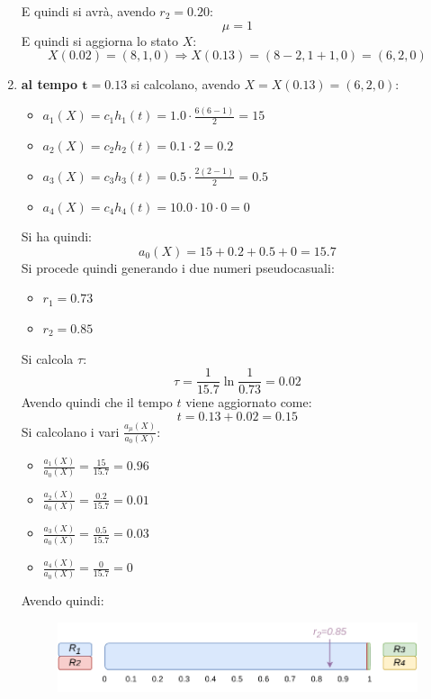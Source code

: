 \documentclass{article}
\begin{document}
\begin{enumerate}[label=\roman*)]
  E quindi si avrà, avendo $r_2=0.20$:
  \[\mu=1\]
  E quindi si aggiorna lo stato $X$:
  \[X(0.02) = (8,1,0) \Rightarrow X(0.13) = (8-2,1+1,0) = (6,2,0)\]
  \newpage
  \item \textbf{al tempo $\mathbf{t=0.13}$} si calcolano, avendo
  $X=X(0.13)=(6,2,0)$: 
  \begin{multicols}{2}
    \begin{itemize}
      \item $a_1(X)=c_1h_1(t)=1.0\cdot\frac{6(6-1)}{2}=15$
      \item $a_2(X)=c_2h_2(t)=0.1\cdot 2=0.2$
      \item $a_3(X)=c_3h_3(t)=0.5\cdot \frac{2(2-1)}{2}=0.5$
      \item $a_4(X)=c_4h_4(t)=10.0\cdot 10 \cdot 0=0$
    \end{itemize}
  \end{multicols}
  Si ha quindi:
  \[a_0(X)=15+0.2+0.5+0=15.7\]
  Si procede quindi generando i due numeri pseudocasuali:
  \begin{multicols}{2}
    \begin{itemize}
      \item $r_1=0.73$
      \item $r_2=0.85$
    \end{itemize}
  \end{multicols}
  Si calcola $\tau$:
  \[\tau=\frac{1}{15.7}\ln\frac{1}{0.73}=0.02\]
  Avendo quindi che il tempo $t$ viene aggiornato come:
  \[t=0.13+0.02=0.15\]
  Si calcolano i vari $\frac{a_\mu(X)}{a_0(X)}$:
  \begin{multicols}{2}
    \begin{itemize}
      \item $\frac{a_1(X)}{a_0(X)}=\frac{15}{15.7}=0.96$
      \item $\frac{a_2(X)}{a_0(X)}=\frac{0.2}{15.7}=0.01$
      \item $\frac{a_3(X)}{a_0(X)}=\frac{0.5}{15.7}=0.03$
      \item $\frac{a_4(X)}{a_0(X)}=\frac{0}{15.7}=0$
    \end{itemize}
  \end{multicols}
  Avendo quindi:
  \begin{figure}[H]
    \centering
    \includegraphics[scale = 0.8]{img/t3.pdf}

\end{figure}
\end{enumerate}
\end{document}
